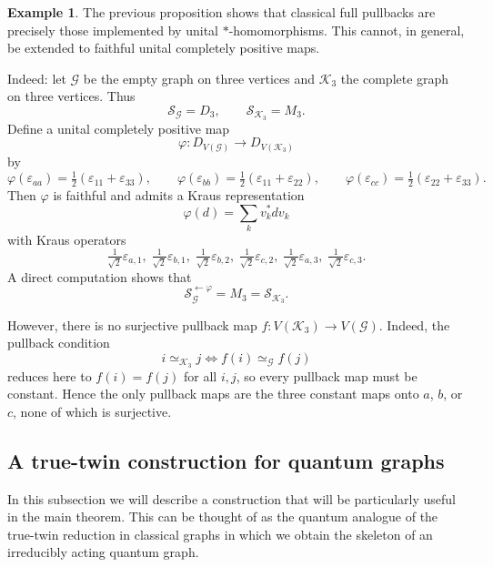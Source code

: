 \documentclass[11pt]{amsart}
\numberwithin{equation}{section}
\theoremstyle{plain}
\theoremstyle{definition}
\newtheorem{example}[theorem]{Example}
\theoremstyle{remark}
\newcommand{\G}{{\mathcal{G}}}
\newcommand{\K}{{\mathcal{K}}}
\renewcommand{\S}{{\mathcal{S}}}
\newcommand\vphi{\varphi}
\begin{document}
\begin{example}
The previous proposition shows that classical full pullbacks are precisely those implemented by unital $*$-homomorphisms. This cannot, in general, be extended to faithful unital completely positive maps.

Indeed: let $\G$ be the empty graph on three vertices and $\K_3$ the complete graph on three vertices. Thus
\[
\S_{\G}=D_3, \qquad \S_{\K_3}=M_3.
\]
Define a unital completely positive map
\[
\vphi \colon D_{V(\G)}\to D_{V(\K_3)}
\]
by
\[
\vphi(\varepsilon_{aa})=\tfrac12(\varepsilon_{11}+\varepsilon_{33}),\qquad
\vphi(\varepsilon_{bb})=\tfrac12(\varepsilon_{11}+\varepsilon_{22}),\qquad
\vphi(\varepsilon_{cc})=\tfrac12(\varepsilon_{22}+\varepsilon_{33}).
\]
Then $\vphi$ is faithful and admits a Kraus representation
\[
\vphi(d)=\sum_k v_k^* d v_k
\]
with Kraus operators
\[
\tfrac1{\sqrt2}\varepsilon_{a,1},\;
\tfrac1{\sqrt2}\varepsilon_{b,1},\;
\tfrac1{\sqrt2}\varepsilon_{b,2},\;
\tfrac1{\sqrt2}\varepsilon_{c,2},\;
\tfrac1{\sqrt2}\varepsilon_{a,3},\;
\tfrac1{\sqrt2}\varepsilon_{c,3}.
\]
A direct computation shows that
\[
\S_{\G}^{\leftarrow\vphi}=M_3=\S_{\K_3}.
\]

However, there is no surjective pullback map $f \colon V(\K_3)\to V(\G)$.
Indeed, the pullback condition
\[
i\simeq_{\K_3}j \iff f(i)\simeq_{\G}f(j)
\]
reduces here to $f(i)=f(j)$ for all $i,j$, so every pullback map must be constant.
Hence the only pullback maps are the three constant maps onto $a$, $b$, or $c$,
none of which is surjective.
\end{example}

\subsection{A true-twin construction for quantum graphs} \label{sec:quantumreduction}
In this subsection we will describe a  construction that will be particularly useful in the main theorem. This can be thought of as the quantum analogue of the true-twin reduction in classical graphs in which we obtain the skeleton of an irreducibly acting quantum graph.
\end{document}

